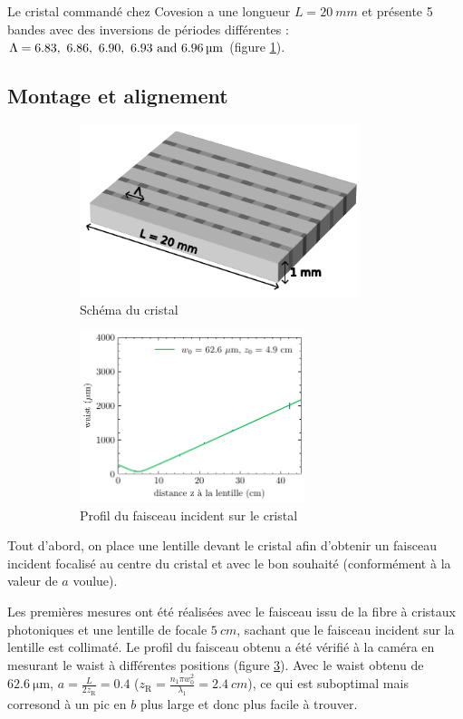 \documentclass[11pt,a4paper] { article}
\newcommand{\zr}{z_\mathsc{R}}
\newcommand{\mathsc}[1]{\mathrm{\scriptscriptstyle {#1}}}
\begin{document}
Le cristal commandé chez Covesion a une longueur $L=\SI{20}{mm}$ et présente 5 bandes avec des inversions de périodes différentes : $\Lambda = \qtylist[list-units = single]{6.83; 6.86 ; 6.90 ; 6.93 ; 6,96}{\micro\meter}$ (figure \ref{fig:sc}).

\subsection{Montage et alignement}

\begin{figure}[htpb]
\centering
\hspace*{-0.4cm}
\begin{subfigure}[h]{0.48\textwidth}
	\centering
	\includegraphics[height=5cm]{./img/cristal.pdf}
	\caption{Schéma du cristal}
	\label{fig:sc}
\end{subfigure}
\centering
\hspace*{-0.4cm}
\begin{subfigure}[h]{0.48\textwidth}
    \includegraphics[height=5cm]{../donnees/waist faisceau incident.pdf}
    \caption{Profil du faisceau incident sur le cristal}
    \label{fig:wincident}
\end{subfigure}
\caption{}
\end{figure}

Tout d'abord, on place une lentille devant le cristal afin d'obtenir un faisceau incident focalisé au centre du cristal et avec le bon souhaité (conformément à la valeur de $a$ voulue).

Les premières mesures ont été réalisées avec le faisceau issu de la fibre à cristaux photoniques et une lentille de focale $\SI{5}{cm}$, sachant que le faisceau incident sur la lentille est collimaté. Le profil du faisceau obtenu a été vérifié à la caméra en mesurant le waist à différentes positions (figure \ref{fig:wincident}). Avec le waist obtenu de $\SI{62.6}{\micro\meter}$, $a=\frac{L}{2\zr}=0.4$ ($\zr = \frac{n_1 \pi w_0^2}{\lambda_1} = \SI{2.4}{cm}$), 
 ce qui est suboptimal mais corresond à un pic en $b$ plus large et donc plus facile à trouver.
\end{document}

